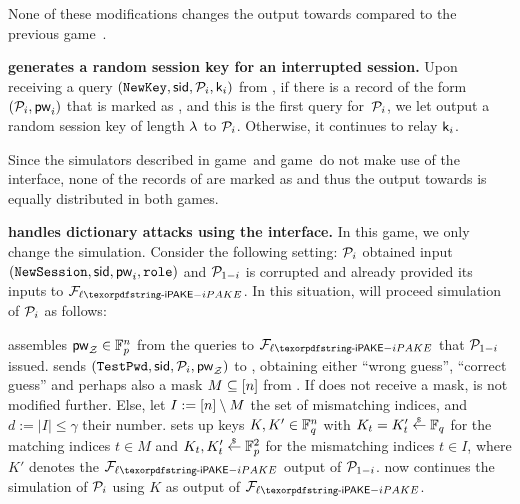 \begin{games}
None of these modifications changes the output towards \Env compared to the previous game~\previousgame.

\textbf{\Func generates a random session key for an interrupted session.}
Upon receiving a query $(\texttt{NewKey},\mathsf{sid},\mathcal{P}_{i},\mathsf{k}_{i})$ from \Sim, if there is a record of the form~$(\mathcal{P}_{i},\mathsf{pw}_{i})$ that is marked as , and this is the first \NewKey query for~$\mathcal{P}_{i}$, we let \Func output a random session key of length $\lambda$ to $\mathcal{P}_{i}$.
Otherwise, it continues to relay $\mathsf{k}_{i}$.

Since the simulators described in game~\previousgame and game~\thisgame do not make use of the \TestPwd interface, none of the records of \Func are marked as  and thus the output towards \Env is equally distributed in both games.

\textbf{\Sim handles dictionary attacks using the \TestPwd interface.}
In this game, we only change the simulation. Consider the following setting: $\mathcal{P}_{i}$ obtained input $(\texttt{NewSession},\mathsf{sid},\mathsf{pw}_{i},\texttt{role})$ and $\mathcal{P}_{1-i}$ is corrupted and already provided its inputs to $\Flipake$.
In this situation, \Sim will proceed simulation of $\mathcal{P}_{i}$ as follows:

\Sim assembles $\mathsf{pw}_\mathcal{Z}\in\mathbb{F}_{p}^{n}$ from the queries to $\Flipake$ that $\mathcal{P}_{1-i}$ issued. \Sim sends $(\texttt{TestPwd},\mathsf{sid},\mathcal{P}_{i},\mathsf{pw}_\mathcal{Z})$ to \Func, obtaining either ``wrong guess'', ``correct guess'' and perhaps also a mask $M\subseteq [n]$ from \Func. If \Sim does not receive a mask, \Sim is not modified further.
Else, let $I:=[n]\setminus M$ the set of mismatching indices, and $d:=|I|\leq\gamma$ their number.
\Sim sets up keys $K, K'\in\mathbb{F}_q^{n}$ with $K_t=K'_t \stackrel{{}_\$}{\leftarrow} \mathbb{F}_q$ for the matching indices $t\in M$
and $K_t,K'_t\stackrel{{}_\$}{\leftarrow}\mathbb{F}_{p}^2$ for the mismatching indices $t\in I$, where $K'$ denotes the $\Flipake$ output of $\mathcal{P}_{1-i}$. \Sim now continues the simulation of $\mathcal{P}_{i}$ using $K$ as output of $\Flipake$. 


\end{games}
